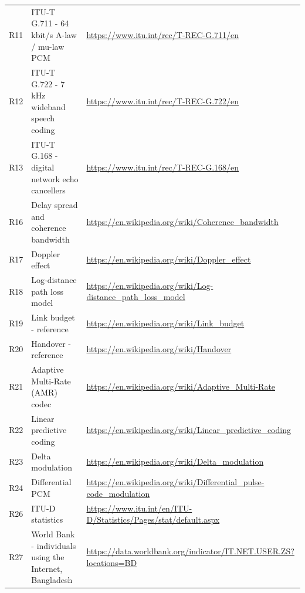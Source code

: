 \documentclass[9pt,a4paper]{extarticle}
\newcommand{\ulinkurl}[1]{#1}
\begin{document}
{\begin{longtable}{@{}p{0.65cm}p{4.4cm}p{9.7cm}@{}}
R11 & ITU-T G.711 - 64 kbit/s A-law / mu-law PCM & \href{https://www.itu.int/rec/T-REC-G.711/en}{\ulinkurl{https://www.itu.int/rec/T-REC-G.711/en}} \\
R12 & ITU-T G.722 - 7 kHz wideband speech coding & \href{https://www.itu.int/rec/T-REC-G.722/en}{\ulinkurl{https://www.itu.int/rec/T-REC-G.722/en}} \\
R13 & ITU-T G.168 - digital network echo cancellers & \href{https://www.itu.int/rec/T-REC-G.168/en}{\ulinkurl{https://www.itu.int/rec/T-REC-G.168/en}} \\
R16 & Delay spread and coherence bandwidth & \href{https://en.wikipedia.org/wiki/Coherence_bandwidth}{\ulinkurl{https://en.wikipedia.org/wiki/Coherence\_bandwidth}} \\
R17 & Doppler effect & \href{https://en.wikipedia.org/wiki/Doppler_effect}{\ulinkurl{https://en.wikipedia.org/wiki/Doppler\_effect}} \\
R18 & Log-distance path loss model & \href{https://en.wikipedia.org/wiki/Log-distance_path_loss_model}{\ulinkurl{https://en.wikipedia.org/wiki/Log-distance\_path\_loss\_model}} \\
R19 & Link budget - reference & \href{https://en.wikipedia.org/wiki/Link_budget}{\ulinkurl{https://en.wikipedia.org/wiki/Link\_budget}} \\
R20 & Handover - reference & \href{https://en.wikipedia.org/wiki/Handover}{\ulinkurl{https://en.wikipedia.org/wiki/Handover}} \\
R21 & Adaptive Multi-Rate (AMR) codec & \href{https://en.wikipedia.org/wiki/Adaptive_Multi-Rate}{\ulinkurl{https://en.wikipedia.org/wiki/Adaptive\_Multi-Rate}} \\
R22 & Linear predictive coding & \href{https://en.wikipedia.org/wiki/Linear_predictive_coding}{\ulinkurl{https://en.wikipedia.org/wiki/Linear\_predictive\_coding}} \\
R23 & Delta modulation & \href{https://en.wikipedia.org/wiki/Delta_modulation}{\ulinkurl{https://en.wikipedia.org/wiki/Delta\_modulation}} \\
R24 & Differential PCM & \href{https://en.wikipedia.org/wiki/Differential_pulse-code_modulation}{\ulinkurl{https://en.wikipedia.org/wiki/Differential\_pulse-code\_modulation}} \\
R26 & ITU-D statistics & \href{https://www.itu.int/en/ITU-D/Statistics/Pages/stat/default.aspx}{\ulinkurl{https://www.itu.int/en/ITU-D/Statistics/Pages/stat/default.aspx}} \\
R27 & World Bank - individuals using the Internet, Bangladesh & \href{https://data.worldbank.org/indicator/IT.NET.USER.ZS?locations=BD}{\ulinkurl{https://data.worldbank.org/indicator/IT.NET.USER.ZS?locations=BD}} \\

\end{longtable}}
\end{document}
